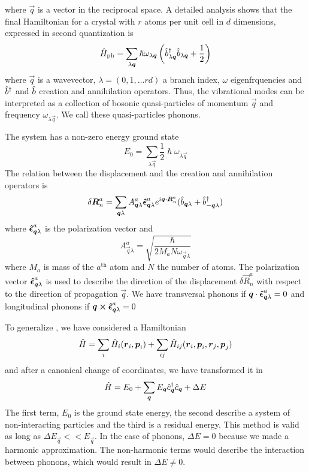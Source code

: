 where $\vec{q}$ is a vector in the reciprocal space. A detailed analysis shows that the final Hamiltonian for a crystal with $r$ atoms per unit cell in $d$ dimensions, expressed in second quantization is
\begin{equation} \label{eq:phonon_hamiltonian}
    \hat{H}_\text{ph} = \sum_{\lambda \mathbf{\boldsymbol{q}}} \hslash \omega_{\lambda\mathbf{\boldsymbol{q}}} \left( \hat{b}^\dagger_{\lambda \mathbf{\boldsymbol{q}}} \hat{b}_{\lambda \mathbf{\boldsymbol{q}}} + \frac{1}{2} \right)
\end{equation}
where $\vec{q}$ is a wavevector, $\lambda = (0,1,\dots rd)$ a branch index, $\omega$ eigenfrquencies and $\hat{b}^\dagger$ and $\hat{b}$ creation and annihilation operators. Thus, the vibrational modes can be interpreted as a collection of bosonic quasi-particles of momentum $\vec{q}$ and frequency $\omega_{\lambda \vec{q}}$. We call these quasi-particles phonons.

The system has a non-zero energy ground state
\begin{equation}
    E_0 = \sum_{\lambda \vec{q}} \frac{1}{2} \hslash\omega_{\lambda\vec{q}}
\end{equation}
The relation between the displacement and the creation and annihilation operators is
\begin{equation} \label{eq:phonon_coordinates}
    \delta \mathbf{\boldsymbol{R}}_n^a = \sum_{\mathbf{\boldsymbol{q}}\lambda} A_{\mathbf{\boldsymbol{q}}\lambda}^a \mathbf{\boldsymbol{\hat{\epsilon}}}_{\mathbf{\boldsymbol{q}}\lambda}^a e^{i\mathbf{\boldsymbol{q}} \cdot \mathbf{\boldsymbol{R}}_n^a} (\hat{b}_{\mathbf{\boldsymbol{q}}\lambda} + \hat{b}^\dagger_{-\mathbf{\boldsymbol{q}}\lambda})
\end{equation}
where $\mathbf{\boldsymbol{\hat{\epsilon}}}_{\mathbf{\boldsymbol{q}}\lambda}^a$ is the polarization vector and
\begin{equation} \label{eq:A_phonon_constant}
    A_{\vec{q}\lambda}^a = \sqrt{\frac{\hslash}{2M_aN\omega_{\vec{q}\lambda}}}
\end{equation}
where $M_a$ is mass of the $a^\text{th}$ atom and $N$ the number of atoms. The polarization vector $\mathbf{\boldsymbol{\hat{\epsilon}}}_{\mathbf{\boldsymbol{q}}\lambda}^a$ is used to describe the direction of the displacement $\delta \vec{R}_n^a$ with respect to the direction of propagation $\vec{q}$. We have transversal phonons if $\mathbf{\boldsymbol{q}} \cdot \mathbf{\boldsymbol{\hat{\epsilon}}}_{\mathbf{\boldsymbol{q}}\lambda}^a = 0$ and longitudinal phonons if $\mathbf{\boldsymbol{q}} \cross \mathbf{\boldsymbol{\hat{\epsilon}}}_{\mathbf{\boldsymbol{q}}\lambda}^a = 0$

To generalize \cite{cohenFundamentalsCondensedMatter}, we have considered a Hamiltonian
\begin{equation}
    \hat{H} = \sum_i \hat{H}_i(\mathbf{\boldsymbol{r}}_i, \mathbf{\boldsymbol{p}}_i) + \sum_{ij} \hat{H}_{ij}(\mathbf{\boldsymbol{r}}_i, \mathbf{\boldsymbol{p}}_i, \mathbf{\boldsymbol{r}}_j, \mathbf{\boldsymbol{p}}_j)
\end{equation}
and after a canonical change of coordinates, we have transformed it in
\begin{equation}
    \hat{H} = E_0 + \sum_{\mathbf{\boldsymbol{q}}} E_{\mathbf{\boldsymbol{q}}} \hat{c}^\dagger_{\mathbf{\boldsymbol{q}}}\hat{c}_{\mathbf{\boldsymbol{q}}} + \Delta E
\end{equation}
The first term, $E_0$ is the ground state energy, the second describe a system of non-interacting particles and the third is a residual energy. This method is valid as long as $\Delta E_\vec{q} << E_\vec{q}$. In the case of phonons, $\Delta E = 0$ because we made a harmonic approximation. The non-harmonic terms would describe the interaction between phonons, which would result in $\Delta E \neq 0$.

